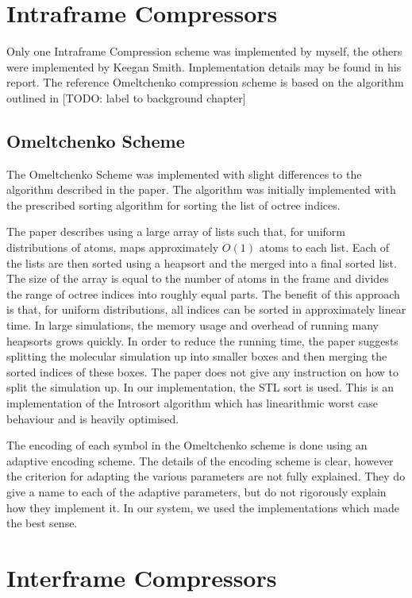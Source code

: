 \documentclass[a4paper,11pt]{report}
\begin{document}
\section{Intraframe Compressors}

Only one Intraframe Compression scheme was implemented by myself, the others were implemented by Keegan Smith. Implementation details may be found in his report. The reference Omeltchenko compression scheme is based on the algorithm outlined in [TODO: label to background chapter]

\subsection{Omeltchenko Scheme}

\label{imp_omelt}
The Omeltchenko Scheme was implemented with slight differences to the algorithm described in the paper. The algorithm was initially implemented with the prescribed sorting algorithm for sorting the list of octree indices. 

The paper describes using a large array of lists such that, for uniform distributions of atoms, maps approximately $O(1)$ atoms to each list. Each of the lists are then sorted using a heapsort and the merged into a final sorted list. The size of the array is equal to the number of atoms in the frame and divides the range of octree indices into roughly equal parts. The benefit of this approach is that, for uniform distributions, all indices can be sorted in approximately linear time.  In large simulations, the memory usage and overhead of running many heapsorts grows quickly. In order to reduce the running time, the paper suggests splitting the molecular simulation up into smaller boxes and then merging the sorted indices of these boxes. The paper does not give any instruction on how to split the simulation up. In our implementation, the STL sort is used. This is an implementation of the Introsort algorithm which has linearithmic worst case behaviour and is heavily optimised.

The encoding of each symbol in the Omeltchenko scheme is done using an adaptive encoding scheme. The details of the encoding scheme is clear, however the criterion for adapting the various parameters are not fully explained. They do give a name to each of the adaptive parameters, but do not rigorously explain how they implement it. In our system, we used the implementations which made the best sense.

\section{Interframe Compressors}
\end{document}
